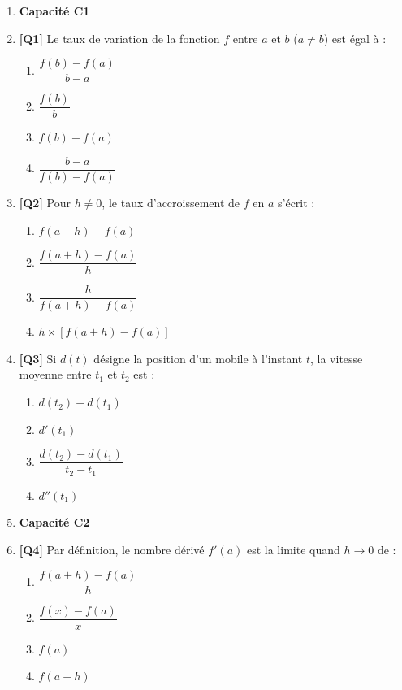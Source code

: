 \begin{enumerate}

\item[] \textbf{Capacité C1}

\item \textbf{[Q1]} Le taux de variation de la fonction $f$ entre $a$ et $b$ ($a \neq b$) est égal à :
  \begin{enumerate}[label=\Alph*.]
    \item $\dfrac{f(b) - f(a)}{b - a}$
    \item $\dfrac{f(b)}{b}$
    \item $f(b) - f(a)$
    \item $\dfrac{b - a}{f(b) - f(a)}$
  \end{enumerate}

\item \textbf{[Q2]} Pour $h \neq 0$, le taux d'accroissement de $f$ en $a$ s'écrit :
  \begin{enumerate}[label=\Alph*.]
    \item $f(a+h) - f(a)$
    \item $\dfrac{f(a+h) - f(a)}{h}$
    \item $\dfrac{h}{f(a+h) - f(a)}$
    \item $h \times [f(a+h) - f(a)]$
  \end{enumerate}

\item \textbf{[Q3]} Si $d(t)$ désigne la position d'un mobile à l'instant $t$, la vitesse moyenne entre $t_1$ et $t_2$ est :
  \begin{enumerate}[label=\Alph*.]
    \item $d(t_2) - d(t_1)$
    \item $d'(t_1)$
    \item $\dfrac{d(t_2) - d(t_1)}{t_2 - t_1}$
    \item $d''(t_1)$
  \end{enumerate}

\item[] \textbf{Capacité C2}

\item \textbf{[Q4]} Par définition, le nombre dérivé $f'(a)$ est la limite quand $h \to 0$ de :
  \begin{enumerate}[label=\Alph*.]
    \item $\dfrac{f(a+h) - f(a)}{h}$
    \item $\dfrac{f(x) - f(a)}{x}$
    \item $f(a)$
    \item $f(a+h)$
  \end{enumerate}


\end{enumerate}
